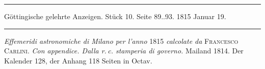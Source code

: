\par\bigskip
\hypertarget{native-579-lower}{}
\begin{center}
\parbox{.92\linewidth}{\centering\small
\rule{\linewidth}{.3pt}\par\smallskip
Göttingische gelehrte Anzeigen. Stück 10. Seite 89..93. 1815 Januar 19.\par\smallskip
\rule{\linewidth}{.3pt}}
\end{center}
\par\medskip

{\setlength{\rightskip}{0pt plus 3em}\emph{Effemeridi astronomiche di Milano per l'anno} 1815 \emph{calcolate da} \textsc{Francesco Carlini}.
\emph{Con appendice. Dalla r.\,c. stamperia di governo.} Mailand 1814. Der Kalender 128, der
Anhang 118 Seiten in Octav.\par}

